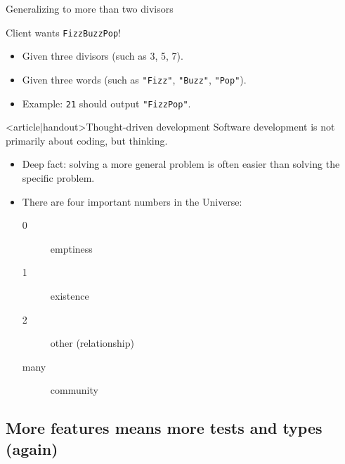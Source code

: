 \begin{frame}[fragile]{Generalizing to more than two divisors}
  \begin{block}{Client wants \texttt{FizzBuzzPop}!}
  \begin{itemize}
  \item Given three divisors (such as 3, 5, 7).
  \item Given three words (such as \texttt{"Fizz"}, \texttt{"Buzz"}, \texttt{"Pop"}).
  \item Example: \texttt{21} should output \texttt{"FizzPop"}.
  \end{itemize}
  \end{block}
\end{frame}

\begin{frame}<article|handout>{Thought-driven development}
    Software development is not primarily about \alert{coding}, but \alert{thinking}.

  \begin{itemize}
  \item Deep fact: solving a more general problem is often easier than solving the specific problem.
  \item There are four important numbers in the Universe:
    \begin{description}
    \item[0] emptiness
    \item[1] existence
    \item[2] other (relationship)
    \item[many] community
    \end{description}
  \end{itemize}
\end{frame}

\subsection{More features means more tests and types (again)}

